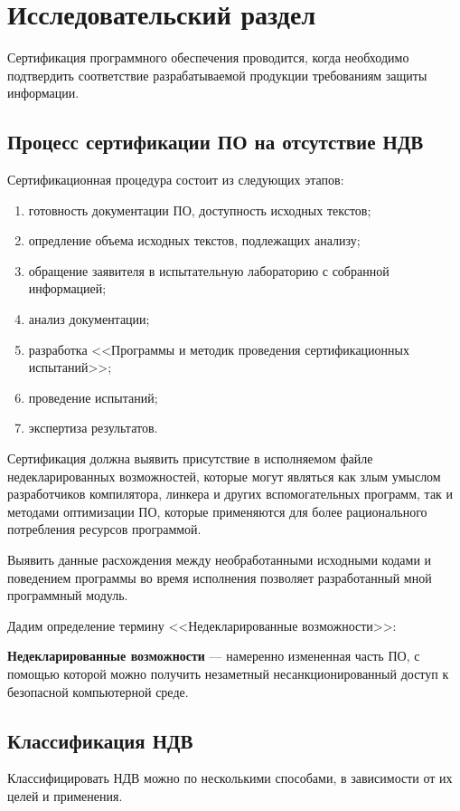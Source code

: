 \chapter{Исследовательский раздел}\label{ch:ch1}
Сертификация программного обеспечения проводится, 
когда необходимо подтвердить соответствие разрабатываемой 
продукции требованиям защиты информации.

\section{Процесс сертификации ПО на отсутствие НДВ}\label{sec:ch1/sec1}
Сертификационная процедура состоит из следующих этапов:
\begin{enumerate}[label={\arabic*)}]
    \item готовность документации ПО, доступность исходных текстов;
    \item опредление объема исходных текстов, подлежащих анализу;
    \item обращение заявителя в испытательную лабораторию с собранной информацией;
    \item анализ документации;
    \item разработка <<Программы и методик проведения сертификационных испытаний>>;
    \item проведение испытаний;
    \item экспертиза результатов.
\end{enumerate}

Сертификация должна выявить присутствие в исполняемом файле недекларированных возможностей,
которые могут являться как злым умыслом\autocite{compile-a-virus, ken-thompson-hack} 
разработчиков компилятора, линкера и других вспомогательных программ,
так и методами оптимизации ПО, которые применяются для более рационального 
потребления ресурсов программой.

Выявить данные расхождения между необработанными исходными кодами и 
поведением программы во время исполнения позволяет разработанный мной
программный модуль.

Дадим определение термину <<Недекларированные возможности>>:

\textbf{Недекларированные возможности}\autocite{undeclared-capabilities-antimalware} 
— намеренно измененная часть ПО, с помощью которой можно получить незаметный 
несанкционированный доступ к безопасной компьютерной среде.

\section{Классификация НДВ}\label{sec:ch1/sec2}
Классифицировать НДВ можно по несколькими способами, в
зависимости от их целей и применения.
